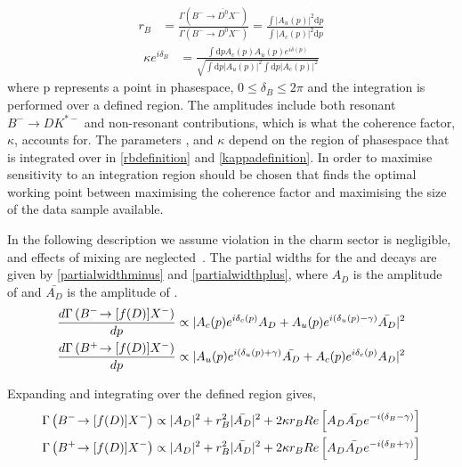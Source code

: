 \begin{align}
r_B &= \frac{\Gamma(B^- \to \bar{D^0}X^-)}{\Gamma(B^- \to D^0X^-)} = \frac{\int \left|A_u(p)\right|^2 \mathrm{d}p}{\int \left|A_c(p)\right|^2 \mathrm{d}p}
\label{rbdefinition}
\end{align}
\begin{align}
\kappa e^{i\delta_B} &= \frac{\int \mathrm{d}p A_c(p)A_u(p)e^{i\delta(p)}}{\sqrt{\int \mathrm{d}p \left|A_u(p)\right|^2 \int \mathrm{d}p \left|A_c(p)\right|^2}}
\label{kappadefinition}
\end{align}
where p represents a point in phasespace, $0 \leq \delta_B \leq 2\pi$ and the integration is performed over a defined \Kstarm region. The amplitudes include both resonant $B^- \to DK^{*-}$ and non-resonant \decay{\Bm}{\D\KS\pim} contributions, which is what the coherence factor, $\kappa$, accounts for. The parameters \rb, \deltab and $\kappa$ depend on the region of \decay{\Bm}{\D\KS\pim} phasespace that is integrated over in \eqn\ref{rbdefinition} and \ref{kappadefinition}. In order to maximise sensitivity to \Pgamma an integration region should be chosen that finds the optimal working point between maximising the coherence factor and maximising the size of the data sample available.

In the following description we assume \CP violation in the charm sector is negligible, and effects of \D mixing are neglected~\cite{charmcpv,charmmixing}. The partial widths for the \Bm and \Bp decays are given by \eqn\ref{partialwidthminus} and \ref{partialwidthplus}, where $A_D$ is the amplitude of  and $\bar{A_{D}}$ is the amplitude of .
\begin{align}
\frac{d\Gamma\left({{{B}^-}}\!\rightarrow [f(D)]X^-\right)}{dp} &\propto | A_c(p) e^{i\delta_c(p)}A_{D} + A_u(p) e^{i(\delta_u(p) - \gamma)}\bar{A_{D}} |^2 \label{partialwidthminus} \\
\frac{d\Gamma\left({{{B}^+}}\!\rightarrow [f(D)]X^-\right)}{dp} &\propto | A_u(p) e^{i(\delta_u(p) + \gamma)}\bar{A_{D}} + A_c(p) e^{i\delta_c(p)}A_{D} |^2 \label{partialwidthplus}
\end{align}

Expanding and integrating over the defined \Kstar region gives,
\begin{align}
\Gamma\left({{{B}^-}}\!\rightarrow [f(D)]X^-\right) &\propto |A_D|^2 + r_B^2 |\bar{A_{D}}|^2 + 2\kappa r_B Re\left[ A_D \bar{A_{D}} e^{-i(\delta_B - \gamma)} \right] \label{BandDdecaysminus} \\
\Gamma\left({{{B}^+}}\!\rightarrow [f(D)]X^-\right) &\propto |A_D|^2 + r_B^2 |\bar{A_{D}}|^2 + 2\kappa r_B Re\left[ A_D \bar{A_{D}} e^{-i(\delta_B + \gamma)} \right] \label{BandDdecaysplus}
\end{align}

